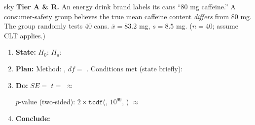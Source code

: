 \documentclass[10pt]{article}
\begin{document}
\begin{scenariobox}{sky}
\textbf{Tier A \& R.} \quad
An energy drink brand labels its cans ``80 mg caffeine.'' A consumer-safety group believes
the true mean caffeine content \emph{differs} from 80 mg. The group randomly tests 40 cans.
$\bar x = 83.2$ mg, $s = 8.5$ mg. ($n = 40$; assume CLT applies.)

\begin{enumerate}[label=\alph*.]
  \item \textbf{State:} $H_0$:  \quad $H_a$: 
  \item \textbf{Plan:} Method: , $df = $ . Conditions met (state briefly):
  \item \textbf{Do:} $SE = $  \quad $t = $  $\approx$ 

        $p$-value (two-sided): $2 \times \texttt{tcdf}$(, $10^{99}$, ) $\approx$ 

  \item \textbf{Conclude:} 
\end{enumerate}
\end{scenariobox}
\end{document}
